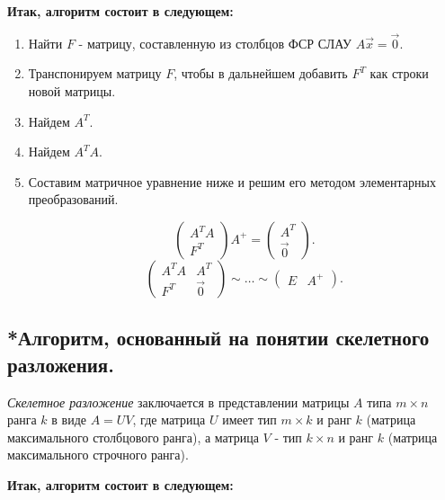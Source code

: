 \textbf{Итак, алгоритм состоит в следующем:}

\begin{enumerate}
    \item Найти $F$ - матрицу, составленную из столбцов ФСР СЛАУ $A\vec{x} = \vec{0}$.
    \item Транспонируем матрицу $F$, чтобы в дальнейшем добавить $F^T$ как строки новой матрицы.
    \item Найдем $A^T$.
    \item Найдем $A^TA$.
    \item Составим матричное уравнение ниже и решим его методом элементарных преобразований.

    \begin{equation*}
        \left(\begin{array}{c}
            A^TA \\
            F^T
        \end{array}\right)A^+
        =
        \left(\begin{array}{c}
            A^T \\
            \vec{0}
        \end{array}\right)
    .\end{equation*}
    \begin{equation*}
        \left(\begin{array}{c|c}
            A^TA & A^T \\
            F^T & \vec{0}
        \end{array}\right)
        \sim \ldots \sim
        \left(\begin{array}{c|c}
            E & A^+
        \end{array}\right)
    .\end{equation*}
\end{enumerate}


\newpage

\subsection{
    *Алгоритм, основанный на понятии скелетного разложения.
}

\textit{Скелетное разложение} заключается в представлении матрицы $A$ типа $m \times n$ ранга $k$ в виде $A = UV$, где матрица $U$ имеет тип $m \times k$ и ранг $k$ (матрица максимального столбцового ранга), а матрица $V$ - тип $k \times n$ и ранг $k$ (матрица максимального строчного ранга).

\textbf{Итак, алгоритм состоит в следующем:}


